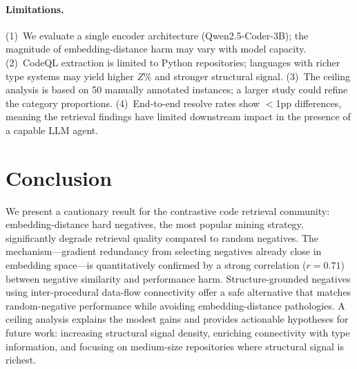 \documentclass[11pt,a4paper]{article}
\begin{document}
\paragraph{Limitations.}
(1)~We evaluate a single encoder architecture (Qwen2.5-Coder-3B); the magnitude of embedding-distance harm may vary with model capacity.
(2)~CodeQL extraction is limited to Python repositories; languages with richer type systems may yield higher $Z\%$ and stronger structural signal.
(3)~The ceiling analysis is based on 50 manually annotated instances; a larger study could refine the category proportions.
(4)~End-to-end resolve rates show $<$1pp differences, meaning the retrieval findings have limited downstream impact in the presence of a capable LLM agent.

\section{Conclusion}

We present a cautionary result for the contrastive code retrieval community: embedding-distance hard negatives, the most popular mining strategy, significantly degrade retrieval quality compared to random negatives.
The mechanism---gradient redundancy from selecting negatives already close in embedding space---is quantitatively confirmed by a strong correlation ($r{=}0.71$) between negative similarity and performance harm.
Structure-grounded negatives using inter-procedural data-flow connectivity offer a safe alternative that matches random-negative performance while avoiding embedding-distance pathologies.
A ceiling analysis explains the modest gains and provides actionable hypotheses for future work: increasing structural signal density, enriching connectivity with type information, and focusing on medium-size repositories where structural signal is richest.
\end{document}
